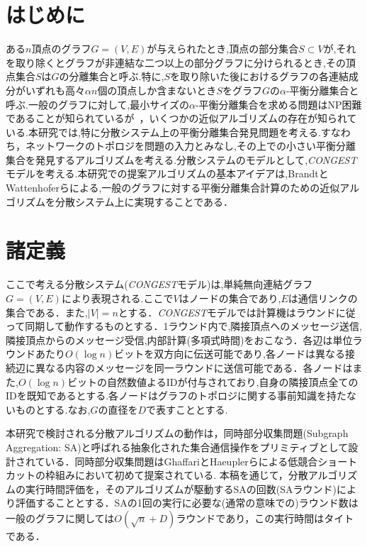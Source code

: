\documentclass[a4j,twoside]{jarticle}
\begin{document}
\twocolumn[\vspace*{9mm}]     %
\begin{論文概要}              %
\setcounter{page}{2}          %

\section{はじめに}
ある$n$頂点のグラフ$G=(V,E)$が与えられたとき,頂点の部分集合$S \subset V$が,それを取り除くとグラフが非連結な二つ以上の部分グラフに分けられるとき,その頂点集合$S$は$G$の分離集合と呼ぶ.特に,$S$を取り除いた後におけるグラフの各連結成分がいずれも高々$\alpha n$個の頂点しか含まないとき$S$をグラフ$G$の$\alpha$-平衡分離集合と呼ぶ.一般のグラフに対して,最小サイズの$\alpha$-平衡分離集合を求める問題はNP困難であることが知られているが~\cite{bui1992finding}，いくつかの近似アルゴリズムの存在が知られている.本研究では,特に分散システム上の平衡分離集合発見問題を考える.すなわち，ネットワークのトポロジを問題の入力とみなし,その上での小さい平衡分離集合を発見するアルゴリズムを考える.分散システムのモデルとして,\textit{CONGEST}モデルを考える.本研究での提案アルゴリズムの基本アイデアは,BrandtとWattenhoferらによる,一般のグラフに対する平衡分離集合計算のための近似アルゴリズム\cite{brandt2017approximating}を分散システム上に実現することである．

\section{諸定義}
ここで考える分散システム(\textit{CONGEST}モデル)は,単純無向連結グラフ$G=(V,E)$により表現される.ここで$V$はノードの集合であり,$E$は通信リンクの集合である．また,$|V|=n$とする．\textit{CONGEST}モデルでは計算機はラウンドに従って同期して動作するものとする．1ラウンド内で,隣接頂点へのメッセージ送信,隣接頂点からのメッセージ受信,内部計算(多項式時間)をおこなう．各辺は単位ラウンドあたり$O(\log n)$ビットを双方向に伝送可能であり,各ノードは異なる接続辺に異なる内容のメッセージを同一ラウンドに送信可能である．各ノードはまた,$O(\log n)$ビットの自然数値よるIDが付与されており,自身の隣接頂点全てのIDを既知であるとする.各ノードはグラフのトポロジに関する事前知識を持たないものとする.なお,$G$の直径を$D$で表すこととする.\par
本研究で検討される分散アルゴリズムの動作は，同時部分収集問題(Subgraph Aggregation: SA)と呼ばれる抽象化された集合通信操作をプリミティブとして設計されている．同時部分収集問題はGhaffariとHaeuplerらによる低競合ショートカット\cite{ghaffari2016distributed}の枠組みにおいて初めて提案されている.
本稿を通じて，分散アルゴリズムの実行時間評価を，そのアルゴリズムが駆動するSAの回数(SAラウンド)により評価することとする．SAの1回の実行に必要な(通常の意味での)ラウンド数は一般のグラフに関しては$O(\sqrt{n} + D)$ラウンドであり，この実行時間はタイトである．

\end{論文概要}
\end{document}
